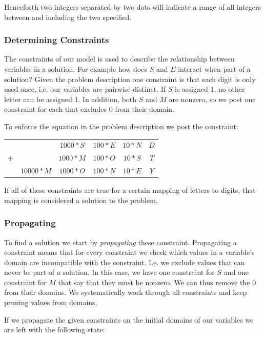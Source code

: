 Henceforth two integers separated by two dots will indicate a range of all integers between
and including the two specified.

\subsubsection{Determining Constraints}

The constraints of our model is used to describe the relationship between variables in a
solution. For example how does $S$ and $E$ interact when part of a solution? Given the
problem description one constraint is that each digit is only used once, i.e. our variables
are pairwise distinct. If $S$ is assigned 1, no other letter can be assigned 1. In addition,
both $S$ and $M$ are nonzero, so we post one constraint for each that excludes 0 from their
domain.

To enforce the equation in the problem description we post the constraint: \\

\begin{tabular}{cccccc}
	& & $1000 * S$ & $100 * E$ & $10 * N$ & $D$ \\
	+ &	& $1000 * M$ & $100 * O$ & $10 * S$ & $T$ \\
	\hline
	& $10000 * M$ & $1000 * O$ & $100 * N$ & $10 * E$ & $Y$
\end{tabular}

If all of these constraints are true for a certain mapping of letters to digits, that
mapping is considered a solution to the problem.

\subsubsection{Propagating}

To find a solution we start by \textit{propagating} these constraint. Propagating a constraint
means that for every constraint we check which values in a variable's domain are incompatible
with the constraint. I.e. we exclude values that can never be part of a solution. In this
case, we have one constraint for $S$ and one constraint for $M$ that say that they must
be nonzero. We can thus remove the 0 from their domains. We systematically work through
all constraints and keep pruning values from domains.

If we propagate the given constraints on the initial domains of our variables we are left
with the following state:

